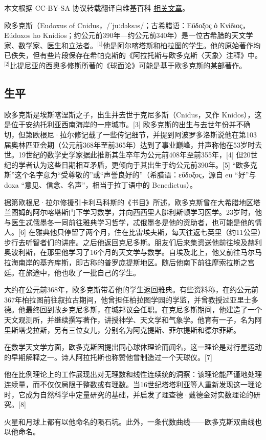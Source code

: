 
本文根据 CC-BY-SA 协议转载翻译自维基百科 \href{https://en.wikipedia.org/wiki/Eudoxus_of_Cnidus}{相关文章}。

欧多克斯（Eudoxus of Cnidus，/ˈjuːdəksəs/；古希腊语：Εὔδοξος ὁ Κνίδιος，Eúdoxos ho Knídios；约公元前390年—约公元前340年）是一位古希腊的天文学家、数学家、医生和立法者。\(^\text{[1]}\)他是阿尔喀塔斯和柏拉图的学生。他的原始著作均已佚失，但有些片段保存在希帕克斯的《阿拉托斯与欧多克斯〈天象〉注释》中。\(^\text{[2]}\)比提尼亚的西奥多修斯所著的《球面论》可能是基于欧多克斯的某部著作。
\subsection{生平}
欧多克斯是埃斯喀涅斯之子，出生并去世于克尼多斯（Cnidus，又作 Knidos），这是位于安纳托利亚西南海岸的一座城市。[3] 欧多克斯的出生与去世年份并不确切，但第欧根尼·拉尔修记载了一些传记细节，并提到阿波罗多洛斯说他在第103届奥林匹亚会期（公元前368年至前365年）达到了事业巅峰，并声称他在53岁时去世。19世纪的数学史学家据此推断其生卒年为公元前408年至前355年，[4] 但20世纪的学者认为这些日期相互矛盾，更倾向于其出生于约公元前390年。[5] “欧多克斯”这个名字意为“受尊敬的”或“声誉良好的”（希腊语：εὔδοξος，源自 eu “好”与 doxa “意见、信念、名声”，相当于拉丁语中的 Benedictus）。

据第欧根尼·拉尔修援引卡利马科斯的《书目》所述，欧多克斯曾在大希腊地区塔兰图姆的阿尔喀塔斯门下学习数学，并向西西里人腓利斯顿学习医学。23岁时，他与医生忒俄墨冬一同前往雅典学习哲学，忒俄墨冬是他的资助者，也可能是他的情人。[6] 在雅典他只停留了两个月，住在比雷埃夫斯，每天往返七英里（约11公里）步行去听智者们的讲座。之后他返回克尼多斯。朋友们后来集资送他前往埃及赫利奥波利斯，在那里他学习了16个月的天文学与数学。自埃及北上，他又前往马尔马拉海南岸的基齐库斯，即古称的普罗庞提斯地区。随后他南下前往摩索拉斯之宫廷。在旅途中，他也收了一批自己的学生。

大约在公元前368年，欧多克斯带着他的学生返回雅典。有些资料称，在约公元前367年柏拉图前往叙拉古期间，他曾担任柏拉图学园的学监，并曾教授过亚里士多德。他最终回到故乡克尼多斯，在城邦议会任职。在克尼多斯期间，他建造了一个天文观测所，并继续撰写著作，讲授神学、天文学和气象学。他育有一子，名为阿里斯塔戈拉斯，另有三位女儿，分别名为阿克提斯、菲尔提斯和德尔菲斯。

在数学天文学方面，欧多克斯因提出同心球体理论而闻名，这一理论是对行星运动的早期解释之一。诗人阿拉托斯也称赞他曾制造过一个天球仪。[7]

他在比例理论上的工作展现出对无理数和线性连续统的洞察：该理论能严谨地处理连续量，而不仅仅局限于整数或有理数。当16世纪塔塔利亚等人重新发现这一理论时，它成为自然科学中定量研究的基础，并启发了理查德·戴德金对实数理论的研究。[8]

火星和月球上都有以他命名的陨石坑。此外，一条代数曲线——欧多克斯双曲线也以他命名。
